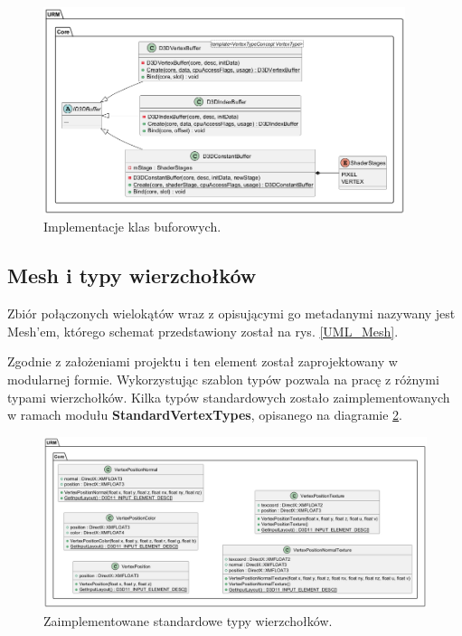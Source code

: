 	\begin{figure}[h!]
		\centering
		\includegraphics[width=400px]{images/UML/buffers.png}
		\caption{Implementacje klas buforowych.}
		\label{UML_Buffers}
	\end{figure}
	
	\vfill
	\clearpage
	
\subsection{Mesh i typy wierzchołków}
\label{SSMeshVertexTypeConcept}
	Zbiór połączonych wielokątów wraz z opisującymi go metadanymi nazywany jest Mesh'em, którego schemat przedstawiony został na rys. \ref{UML_Mesh}.
	
	Zgodnie z założeniami projektu i ten element został zaprojektowany w modularnej formie. Wykorzystując szablon typów pozwala na pracę z różnymi typami wierzchołków. Kilka typów standardowych zostało zaimplementowanych w ramach modułu \textbf{StandardVertexTypes}, opisanego na diagramie \ref{UML_VertexTypes}.
	
	\begin{figure}[h!]
		\centering
		\includegraphics[width=\textwidth]{images/UML/vertextypes.png}
		\caption{Zaimplementowane standardowe typy wierzchołków.}
		\label{UML_VertexTypes}
	\end{figure}
	
